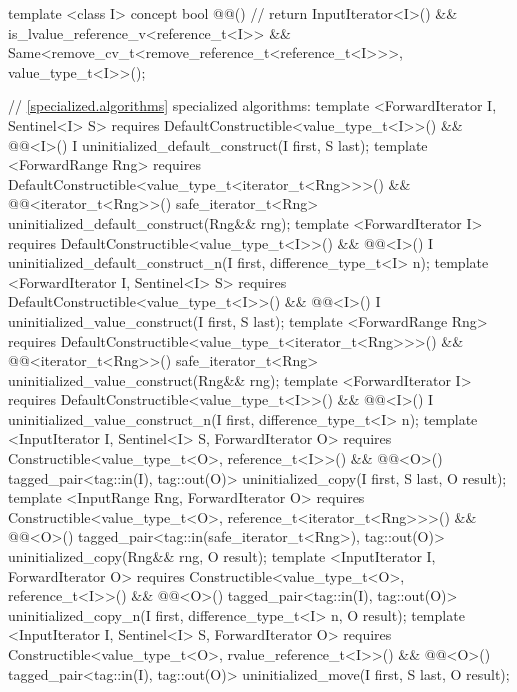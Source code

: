 {\color{addclr}
\begin{codeblock}
template <class I>
concept bool @@() { // \expos
  return InputIterator<I>() &&
    is_lvalue_reference_v<reference_t<I>> &&
    Same<remove_cv_t<remove_reference_t<reference_t<I>>>, value_type_t<I>>();
}

// \ref{specialized.algorithms} specialized algorithms:
template <ForwardIterator I, Sentinel<I> S>
  requires DefaultConstructible<value_type_t<I>>() &&
           @@<I>()
    I uninitialized_default_construct(I first, S last);
template <ForwardRange Rng>
  requires DefaultConstructible<value_type_t<iterator_t<Rng>>>() &&
           @@<iterator_t<Rng>>()
    safe_iterator_t<Rng>
    uninitialized_default_construct(Rng&& rng);
template <ForwardIterator I>
  requires DefaultConstructible<value_type_t<I>>() &&
           @@<I>()
    I uninitialized_default_construct_n(I first, difference_type_t<I> n);
template <ForwardIterator I, Sentinel<I> S>
  requires DefaultConstructible<value_type_t<I>>() &&
           @@<I>()
    I uninitialized_value_construct(I first, S last);
template <ForwardRange Rng>
  requires DefaultConstructible<value_type_t<iterator_t<Rng>>>() &&
           @@<iterator_t<Rng>>()
    safe_iterator_t<Rng>
    uninitialized_value_construct(Rng&& rng);
template <ForwardIterator I>
  requires DefaultConstructible<value_type_t<I>>() &&
           @@<I>()
    I uninitialized_value_construct_n(I first, difference_type_t<I> n);
template <InputIterator I, Sentinel<I> S, ForwardIterator O>
  requires Constructible<value_type_t<O>, reference_t<I>>() &&
           @@<O>()
    tagged_pair<tag::in(I), tag::out(O)>
    uninitialized_copy(I first, S last, O result);
template <InputRange Rng, ForwardIterator O>
  requires Constructible<value_type_t<O>, reference_t<iterator_t<Rng>>>() &&
           @@<O>()
    tagged_pair<tag::in(safe_iterator_t<Rng>), tag::out(O)>
    uninitialized_copy(Rng&& rng, O result);
template <InputIterator I, ForwardIterator O>
  requires Constructible<value_type_t<O>, reference_t<I>>() &&
           @@<O>()
    tagged_pair<tag::in(I), tag::out(O)>
    uninitialized_copy_n(I first, difference_type_t<I> n, O result);
template <InputIterator I, Sentinel<I> S, ForwardIterator O>
  requires Constructible<value_type_t<O>, rvalue_reference_t<I>>() &&
           @@<O>()
    tagged_pair<tag::in(I), tag::out(O)> uninitialized_move(I first, S last, O result);

\end{codeblock}}
